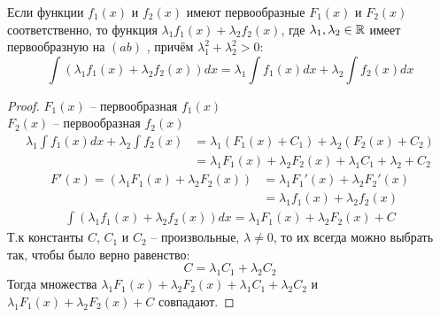 \begin{property}[5]
    Если функции $f_1(x)$ и $f_2(x)$ имеют первообразные $F_1(x)$ и $F_2(x)$ соответственно, то функция $\lambda_1 f_1(x) + \lambda_2 f_2(x)$, где $\lambda_1, \lambda_2 \in \mathbb{R}$ имеет первообразную на $(a b)$ , причём $\lambda_1^2 + \lambda_2^2 > 0$: \[
        \int \left( \lambda_1 f_1(x) + \lambda_2 f_2(x) \right) dx = \lambda_1 \int f_1(x) dx + \lambda_2 \int f_2(x) dx 
    \]
\end{property}
\begin{proof}
    $F_1(x)$ -- первообразная $f_1(x)$ \\
    $F_2(x)$ -- первообразная $f_2(x)$ \\
    \begin{align*}
        \lambda_1 \int f_1(x) dx + \lambda_2 \int f_2(x) &= \lambda_1 \left(F_1(x) + C_1\right) + \lambda_2 \left(F_2(x) + C_2\right) \\
            &= \lambda_1 F_1(x) + \lambda_2 F_2(x) + \lambda_1 C_1 + \lambda_2 + C_2 \tag{1}
    \end{align*}
    \begin{align*}
        F'(x) = \left(\lambda_1 F_1(x) + \lambda_2 F_2(x)\right) &= \lambda_1 F_1'(x) + \lambda_2 F_2'(x) \\
            &= \lambda_1 f_1(x) + \lambda_2 f_2(x) \tag{2}
    \end{align*}
    \begin{align*}
        \int \left(\lambda_1 f_1(x) + \lambda_2 f_2(x) \right)  dx = \lambda_1 F_1(x) + \lambda_2 F_2(x) + C \tag{3}
    \end{align*}
    Т.к константы $C$, $C_1$ и $C_2$ -- произвольные, $\lambda \neq 0$, то их всегда можно выбрать так, чтобы было верно равенство: \[
        C = \lambda_1 C_1 + \lambda_2 C_2
    \]
    Тогда множества $\lambda_1 F_1(x) + \lambda_2 F_2(x) + \lambda_1 C_1 + \lambda_2 C_2$ и $\lambda_1 F_1(x) + \lambda_2 F_2(x) + C$ совпадают.  
\end{proof}

